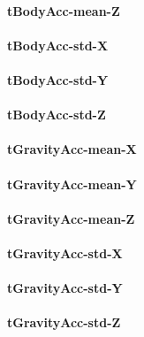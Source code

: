 \documentclass[
]{article}
\begin{document}
\hypertarget{tbodyacc-mean-z}{%
\paragraph{tBodyAcc-mean-Z}\label{tbodyacc-mean-z}}

\hypertarget{tbodyacc-std-x}{%
\paragraph{tBodyAcc-std-X}\label{tbodyacc-std-x}}

\hypertarget{tbodyacc-std-y}{%
\paragraph{tBodyAcc-std-Y}\label{tbodyacc-std-y}}

\hypertarget{tbodyacc-std-z}{%
\paragraph{tBodyAcc-std-Z}\label{tbodyacc-std-z}}

\hypertarget{tgravityacc-mean-x}{%
\paragraph{tGravityAcc-mean-X}\label{tgravityacc-mean-x}}

\hypertarget{tgravityacc-mean-y}{%
\paragraph{tGravityAcc-mean-Y}\label{tgravityacc-mean-y}}

\hypertarget{tgravityacc-mean-z}{%
\paragraph{tGravityAcc-mean-Z}\label{tgravityacc-mean-z}}

\hypertarget{tgravityacc-std-x}{%
\paragraph{tGravityAcc-std-X}\label{tgravityacc-std-x}}

\hypertarget{tgravityacc-std-y}{%
\paragraph{tGravityAcc-std-Y}\label{tgravityacc-std-y}}

\hypertarget{tgravityacc-std-z}{%
\paragraph{tGravityAcc-std-Z}\label{tgravityacc-std-z}}
\end{document}
